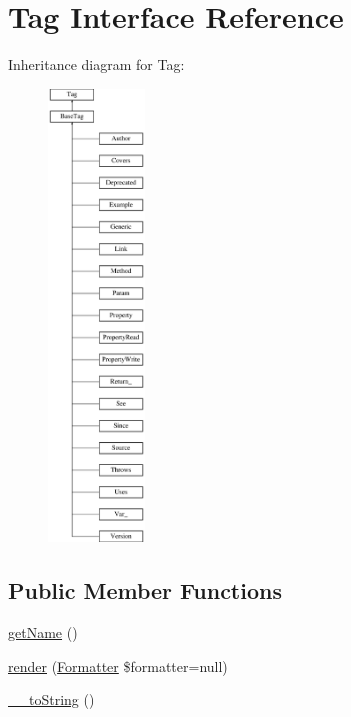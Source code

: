 \hypertarget{interfacephp_documentor_1_1_reflection_1_1_doc_block_1_1_tag}{}\section{Tag Interface Reference}
\label{interfacephp_documentor_1_1_reflection_1_1_doc_block_1_1_tag}
Inheritance diagram for Tag\+:\begin{figure}[H]
\begin{center}
\leavevmode
\includegraphics[height=12.000000cm]{interfacephp_documentor_1_1_reflection_1_1_doc_block_1_1_tag}
\end{center}
\end{figure}
\subsection*{Public Member Functions}
\begin{DoxyCompactItemize}
\item 
\mbox{\hyperlink{interfacephp_documentor_1_1_reflection_1_1_doc_block_1_1_tag_a3d0963e68bb313b163a73f2803c64600}{get\+Name}} ()
\item 
\mbox{\hyperlink{interfacephp_documentor_1_1_reflection_1_1_doc_block_1_1_tag_ac20fbfe3216d76776b5e743bd16427f9}{render}} (\mbox{\hyperlink{interfacephp_documentor_1_1_reflection_1_1_doc_block_1_1_tags_1_1_formatter}{Formatter}} \$formatter=null)
\item 
\mbox{\hyperlink{interfacephp_documentor_1_1_reflection_1_1_doc_block_1_1_tag_a7516ca30af0db3cdbf9a7739b48ce91d}{\+\_\+\+\_\+to\+String}} ()
\end{DoxyCompactItemize}
